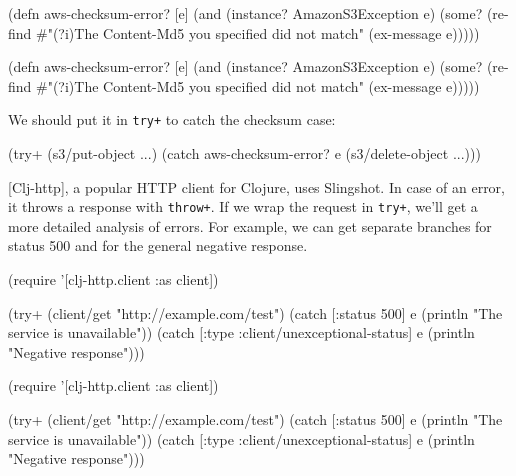 \ifx\DEVICETYPE\MOBILE

\begin{clojure}
(defn aws-checksum-error? [e]
  (and
    (instance? AmazonS3Exception e)
    (some?
      (re-find
        #"(?i)The Content-Md5
            you specified did not match"
        (ex-message e)))))
\end{clojure}

\else

\begin{clojure}
(defn aws-checksum-error? [e]
  (and (instance? AmazonS3Exception e)
       (some?
        (re-find
         #"(?i)The Content-Md5 you specified did not match"
         (ex-message e)))))
\end{clojure}

\fi

\noindent
We should put it in \verb|try+| to catch the checksum case:

\begin{clojure}
(try+
  (s3/put-object ...)
  (catch aws-checksum-error? e
    (s3/delete-object ...)))
\end{clojure}

[Clj-http], a popular HTTP client for Clojure, uses Slingshot. In case of an error, it throws a response with \verb|throw+|. If we wrap the request in \verb|try+|, we'll get a more detailed analysis of errors. For example, we can get separate branches for status 500 and for the general negative response.

\ifx\DEVICETYPE\MOBILE

\begin{clojure}
(require '[clj-http.client :as client])

(try+
 (client/get "http://example.com/test")
 (catch [:status 500] e
  (println "The service is unavailable"))
 (catch
  [:type :client/unexceptional-status] e
  (println "Negative response")))
\end{clojure}

\else

\begin{clojure}
(require '[clj-http.client :as client])

(try+
 (client/get "http://example.com/test")
 (catch [:status 500] e
   (println "The service is unavailable"))
 (catch [:type :client/unexceptional-status] e
   (println "Negative response")))
\end{clojure}

\fi

